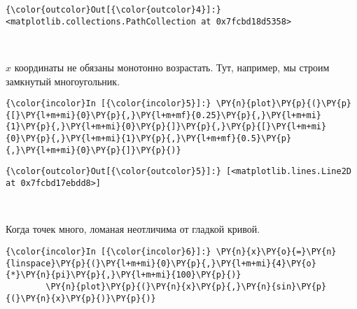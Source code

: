             \begin{Verbatim}[commandchars=\\\{\}]
{\color{outcolor}Out[{\color{outcolor}4}]:} <matplotlib.collections.PathCollection at 0x7fcbd18d5358>
\end{Verbatim}
        
    \begin{center}
    \end{center}
    { \hspace*{\fill} \\}
    
    \(x\) координаты не обязаны монотонно возрастать. Тут, например, мы
строим замкнутый многоугольник.

    \begin{Verbatim}[commandchars=\\\{\}]
{\color{incolor}In [{\color{incolor}5}]:} \PY{n}{plot}\PY{p}{(}\PY{p}{[}\PY{l+m+mi}{0}\PY{p}{,}\PY{l+m+mf}{0.25}\PY{p}{,}\PY{l+m+mi}{1}\PY{p}{,}\PY{l+m+mi}{0}\PY{p}{]}\PY{p}{,}\PY{p}{[}\PY{l+m+mi}{0}\PY{p}{,}\PY{l+m+mi}{1}\PY{p}{,}\PY{l+m+mf}{0.5}\PY{p}{,}\PY{l+m+mi}{0}\PY{p}{]}\PY{p}{)}
\end{Verbatim}

            \begin{Verbatim}[commandchars=\\\{\}]
{\color{outcolor}Out[{\color{outcolor}5}]:} [<matplotlib.lines.Line2D at 0x7fcbd17ebdd8>]
\end{Verbatim}
        
    \begin{center}
    \end{center}
    { \hspace*{\fill} \\}
    
    Когда точек много, ломаная неотличима от гладкой кривой.

    \begin{Verbatim}[commandchars=\\\{\}]
{\color{incolor}In [{\color{incolor}6}]:} \PY{n}{x}\PY{o}{=}\PY{n}{linspace}\PY{p}{(}\PY{l+m+mi}{0}\PY{p}{,}\PY{l+m+mi}{4}\PY{o}{*}\PY{n}{pi}\PY{p}{,}\PY{l+m+mi}{100}\PY{p}{)}
        \PY{n}{plot}\PY{p}{(}\PY{n}{x}\PY{p}{,}\PY{n}{sin}\PY{p}{(}\PY{n}{x}\PY{p}{)}\PY{p}{)}
\end{Verbatim}

